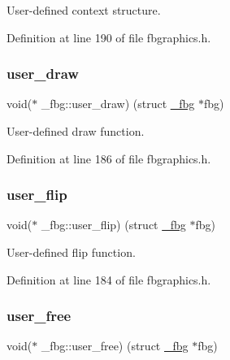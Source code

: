 User-\/defined context structure. 



Definition at line 190 of file fbgraphics.\+h.

\mbox{\label{struct__fbg_ac66a762877982c6f381a7cfd54a8f17e}} 
\subsubsection{\texorpdfstring{user\+\_\+draw}{user\_draw}}
{\footnotesize\ttfamily void($\ast$ \+\_\+fbg\+::user\+\_\+draw) (struct \mbox{\hyperlink{struct__fbg}{\+\_\+fbg}} $\ast$fbg)}



User-\/defined draw function. 



Definition at line 186 of file fbgraphics.\+h.

\mbox{\label{struct__fbg_a3f2ad2eb06555cdbe2d18f541231cb37}} 
\subsubsection{\texorpdfstring{user\+\_\+flip}{user\_flip}}
{\footnotesize\ttfamily void($\ast$ \+\_\+fbg\+::user\+\_\+flip) (struct \mbox{\hyperlink{struct__fbg}{\+\_\+fbg}} $\ast$fbg)}



User-\/defined flip function. 



Definition at line 184 of file fbgraphics.\+h.

\mbox{\label{struct__fbg_a88d48b502672cfb8bd2c94ea3feac8d0}} 
\subsubsection{\texorpdfstring{user\+\_\+free}{user\_free}}
{\footnotesize\ttfamily void($\ast$ \+\_\+fbg\+::user\+\_\+free) (struct \mbox{\hyperlink{struct__fbg}{\+\_\+fbg}} $\ast$fbg)}




